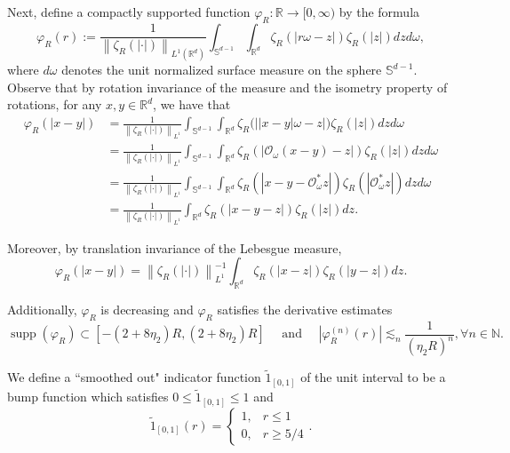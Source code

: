 \documentclass[reqno,11pt]{amsart}
\theoremstyle{plain}
\theoremstyle{definition}
\numberwithin{equation}{section}
\numberwithin{theorem}{section}
\def\geq{\geqslant}
\def\leq{\leqslant}
\begin{document}
Next, define a compactly supported function $\varphi_{R}: \mathbb{R} \rightarrow[0, \infty)$ by the formula
\begin{equation}\label{equ:varphiRdef}
\varphi_{R}(r):=\frac{1}{\left\|\zeta_{R}(|\cdot|)\right\|_{L^{1}\left(\mathbb{R}^{d}\right)}} \int_{\mathbb{S}^{d-1}} \int_{\mathbb{R}^{d}} \zeta_{R}(|r \omega-z|) \zeta_{R}(|z|) d z d \omega, 
\end{equation}
where $d \omega$ denotes the unit normalized surface measure on the sphere $\mathbb{S}^{d-1}$. Observe that by rotation invariance of the measure and the isometry property of rotations, for any $x, y \in \mathbb{R}^{d}$, we have that
\begin{align*}
\varphi_{R}(|x-y|) & =\frac{1}{\left\|\zeta_{R}(|\cdot|)\right\|_{L^{1}}} \int_{\mathbb{S}^{d-1}} \int_{\mathbb{R}^{d}} \zeta_{R}\big(\big||x-y| \omega-z\big|\big) \zeta_{R}(|z|) d z d \omega \\
& =\frac{1}{\left\|\zeta_{R}(|\cdot|)\right\|_{L^{1}}} \int_{\mathbb{S}^{d-1}} \int_{\mathbb{R}^{d}} \zeta_{R}\left(\left|\mathcal{O}_{\omega}(x-y)-z\right|\right) \zeta_{R}(|z|) d z d \omega \\
& =\frac{1}{\left\|\zeta_{R}(|\cdot|)\right\|_{L^{1}}} \int_{\mathbb{S}^{d-1}} \int_{\mathbb{R}^{d}} \zeta_{R}\left(\left|x-y-\mathcal{O}_{\omega}^{*} z\right|\right) \zeta_{R}\left(\left|\mathcal{O}_{\omega}^{*} z\right|\right) d z d \omega \\
& =\frac{1}{\left\|\zeta_{R}(|\cdot|)\right\|_{L^{1}}} \int_{\mathbb{R}^{d}} \zeta_{R}(|x-y-z|) \zeta_{R}(|z|) d z .
\end{align*}


Moreover, by translation invariance of the Lebesgue measure,
\begin{equation*}
\varphi_{R}(|x-y|)=\left\|\zeta_{R}(|\cdot|)\right\|_{L^{1}}^{-1} \int_{\mathbb{R}^{d}} \zeta_{R}(|x-z|) \zeta_{R}(|y-z|) d z. 
\end{equation*}


Additionally, $\varphi_{R}$ is decreasing and $\varphi_{R}$ satisfies the derivative estimates
\begin{equation*}
\operatorname{supp}\left(\varphi_{R}\right) \subset\left[-\left(2+8 \eta_{2}\right) R,\left(2+8 \eta_{2}\right) R\right] \quad \text { and } \quad\left|\varphi_{R}^{(n)}(r)\right| \lesssim_{n} \frac{1}{\left(\eta_{2} R\right)^{n}}, \forall n \in \mathbb{N} . 
\end{equation*}

We define a ``smoothed out" indicator function $\tilde{1}_{[0,1]}$ of the unit interval to be a bump function which satisfies $0 \leq \tilde{1}_{[0,1]} \leq 1$ and
\begin{equation}\label{def1}
    \tilde{1}_{[0,1]}(r)=\left\{\begin{array}{ll}
1, & r \leq 1 \\
0, & r \geq 5 / 4
\end{array} .\right.
\end{equation}
\end{document}
